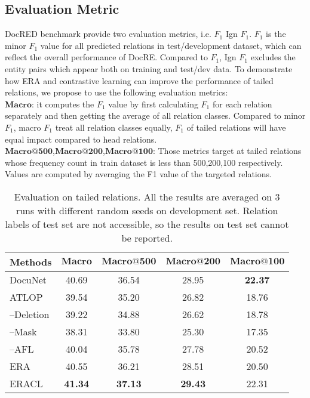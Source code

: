 \documentclass[11pt]{article}
\begin{document}
\subsection{Evaluation Metric}
    DocRED benchmark provide two evaluation metrics, i.e. $F_1$ Ign $F_1$. $F_1$ is the minor $F_1$ value for all predicted relations in test/development dataset, which can reflect the overall performance of DocRE. Compared to $F_1$, Ign $F_1$ excludes the entity pairs which appear both on training and test/dev data.
    To demonstrate how ERA and contrastive learning can improve the performance of tailed relations, we propose to use the following evaluation metrics: \\
    $\mathbf{Macro}$: it computes the $F_1$ value by first calculating $F_1$ for each relation separately and then getting the average of all relation classes. Compared to minor $F_1$, macro $F_1$ treat all relation classes equally, $F_1$ of tailed relations will have equal impact compared to head relations.\\
    $\mathbf{Macro@500}$,$\mathbf{Macro@200}$,$\mathbf{Macro@100}$: Those metrics target at tailed relations whose frequency count in train dataset is less than 500,200,100 respectively. Values are computed by averaging the F1 value of the targeted relations.

\begin{table*}[h]
\centering
    \begin{tabular}{lcccc}
    \toprule
    Methods & $\mathbf{Macro}$ & $\mathbf{Macro@500}$ & $\mathbf{Macro@200}$ & $\mathbf{Macro@100}$  \\
    \midrule
    DocuNet &40.69 & 36.54 & 28.95 & \bf{22.37}          \\
    ATLOP   & 39.54 & 35.20 & 26.82 & 18.76         \\
    \hline
    --Deletion &39.22 &34.88 &26.62 &18.78 \\
    --Mask &38.31 &33.80 &25.30 &17.35 \\
    --AFL &40.04 &35.78 &27.78 &20.52 \\
    \hline
    ERA     & 40.55 & 36.21 & 28.51 & 20.50 \\
    ERACL   & \bf{41.34} & \bf{37.13} & \bf{29.43} & 22.31     \\
    \toprule
\end{tabular}
    \caption{Evaluation on tailed relations. All the results are averaged on 3 runs with different random seeds on development set. Relation labels of test set are not accessible, so the results on test set cannot be reported.}
    \label{tb:tail-results}
\end{table*}
\end{document}
